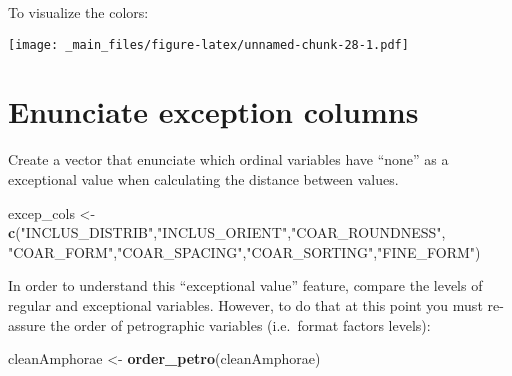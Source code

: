 \documentclass[12pt,]{book}
\newenvironment{Shaded}{\begin{snugshade}}{\end{snugshade}}
\newcommand{\DataTypeTok}[1]{\textcolor[rgb]{0.13,0.29,0.53}{#1}}
\newcommand{\DecValTok}[1]{\textcolor[rgb]{0.00,0.00,0.81}{#1}}
\newcommand{\KeywordTok}[1]{\textcolor[rgb]{0.13,0.29,0.53}{\textbf{#1}}}
\newcommand{\NormalTok}[1]{#1}
\newcommand{\OperatorTok}[1]{\textcolor[rgb]{0.81,0.36,0.00}{\textbf{#1}}}
\newcommand{\OtherTok}[1]{\textcolor[rgb]{0.56,0.35,0.01}{#1}}
\newcommand{\StringTok}[1]{\textcolor[rgb]{0.31,0.60,0.02}{#1}}
\begin{document}
To visualize the colors:

\begin{Shaded}
\end{Shaded}

\texttt{[image: \_main\_files/figure-latex/unnamed-chunk-28-1.pdf]}

\hypertarget{enunciate-exception-columns}{%
\section{Enunciate exception columns}\label{enunciate-exception-columns}}

Create a vector that enunciate which ordinal variables have ``none'' as a exceptional value when calculating the distance between values.

\begin{Shaded}
\begin{Highlighting}[]
\NormalTok{excep_cols <-}\StringTok{ }\KeywordTok{c}\NormalTok{(}\StringTok{"INCLUS_DISTRIB"}\NormalTok{,}\StringTok{"INCLUS_ORIENT"}\NormalTok{,}\StringTok{"COAR_ROUNDNESS"}\NormalTok{,}
                \StringTok{"COAR_FORM"}\NormalTok{,}\StringTok{"COAR_SPACING"}\NormalTok{,}\StringTok{"COAR_SORTING"}\NormalTok{,}\StringTok{"FINE_FORM"}\NormalTok{)}
\end{Highlighting}
\end{Shaded}

In order to understand this ``exceptional value'' feature, compare the levels of regular and exceptional variables. However, to do that at this point you must re-assure the order of petrographic variables (i.e.~format factors levels):

\begin{Shaded}
\begin{Highlighting}[]
\NormalTok{cleanAmphorae <-}\StringTok{ }\KeywordTok{order_petro}\NormalTok{(cleanAmphorae)}
\end{Highlighting}
\end{Shaded}
\end{document}
